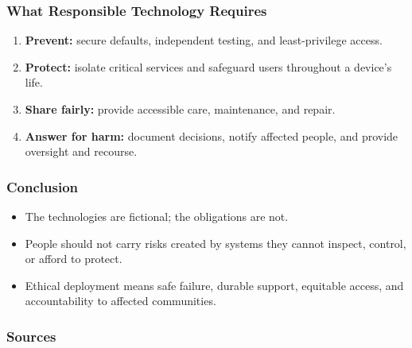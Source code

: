 \documentclass{beamer}%
\begin{document}
\begin{frame}
\frametitle{What Responsible Technology Requires}
\begin{enumerate}
  \item \textbf{Prevent:} secure defaults, independent testing, and least-privilege access.
  \item \textbf{Protect:} isolate critical services and safeguard users throughout a device's life.
  \item \textbf{Share fairly:} provide accessible care, maintenance, and repair.
  \item \textbf{Answer for harm:} document decisions, notify affected people, and provide oversight and recourse.
\end{enumerate}
\end{frame}

\begin{frame}
\frametitle{Conclusion}
\begin{itemize}
  \item The technologies are fictional; the obligations are not.
  \item People should not carry risks created by systems they cannot inspect, control, or afford to protect.
  \item Ethical deployment means safe failure, durable support, equitable access, and accountability to affected communities.
\end{itemize}
\end{frame}

\begin{frame}
\frametitle{Sources}


\end{frame}
\end{document}
